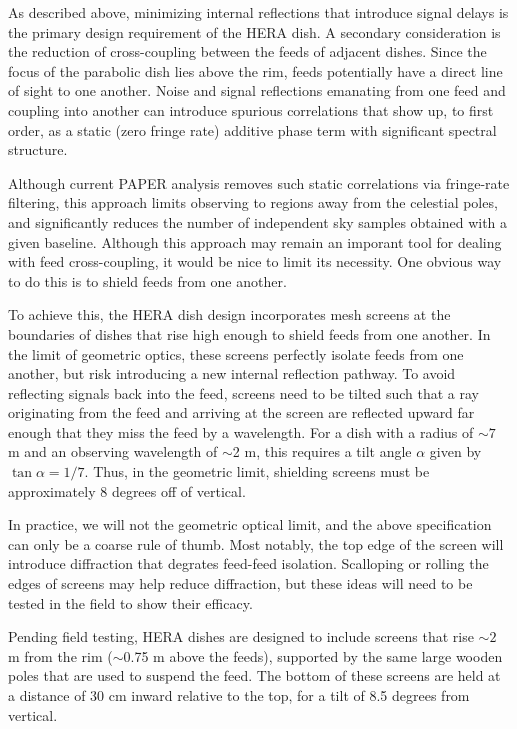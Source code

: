 \documentclass[11pt]{article}
\begin{document}
As described above, minimizing internal reflections that introduce signal delays is
the primary design requirement of the HERA dish.  A secondary consideration is the
reduction of cross-coupling between the feeds of adjacent dishes.  Since the focus of
the parabolic dish lies above the rim, feeds potentially have a direct line of sight to
one another.  Noise and signal reflections emanating from one feed and coupling into another
can introduce spurious correlations that show up, to first order, as a static (zero fringe rate) additive
phase term with significant spectral structure.  

Although current PAPER analysis removes such static correlations via fringe-rate filtering, this
approach limits observing to regions away from the celestial poles, and significantly reduces the number
of independent sky samples obtained with a given baseline.  Although this approach may remain an
imporant tool for dealing with feed cross-coupling, it would be nice to limit its necessity.
One obvious way to do this is to shield feeds from one another.

To achieve this, the HERA dish design incorporates mesh screens at the boundaries of dishes that rise high
enough to shield feeds from one another.  In the limit of geometric optics, these screens perfectly isolate
feeds from one another, but risk introducing a new internal reflection pathway.  To avoid reflecting signals back into the feed,
screens need to be tilted such that a ray originating from the feed and arriving at the screen are
reflected upward far enough that they miss the feed by a wavelength.
For a dish with a radius of $\sim7$ m and an observing wavelength of $\sim$2 m, this requires a tilt angle $\alpha$
given by $\tan\alpha=1/7$.  Thus, in the geometric limit, shielding screens must be approximately 8 degrees off of vertical.

In practice, we will not the geometric optical limit, and the above specification can only be a coarse rule of thumb.
Most notably, the top edge of the screen will introduce diffraction that degrates feed-feed isolation.  Scalloping
or rolling the edges of screens may help reduce diffraction, but these ideas will need to be tested in the field to
show their efficacy.

Pending field testing, HERA dishes are designed to include screens that rise $\sim2$ m from the rim ($\sim$0.75 m above the 
feeds), supported
by the same large wooden poles that are used to suspend the feed.  The bottom of these screens are held at a distance of
30 cm inward relative to the top, for a tilt of 8.5 degrees from vertical.
\end{document}
